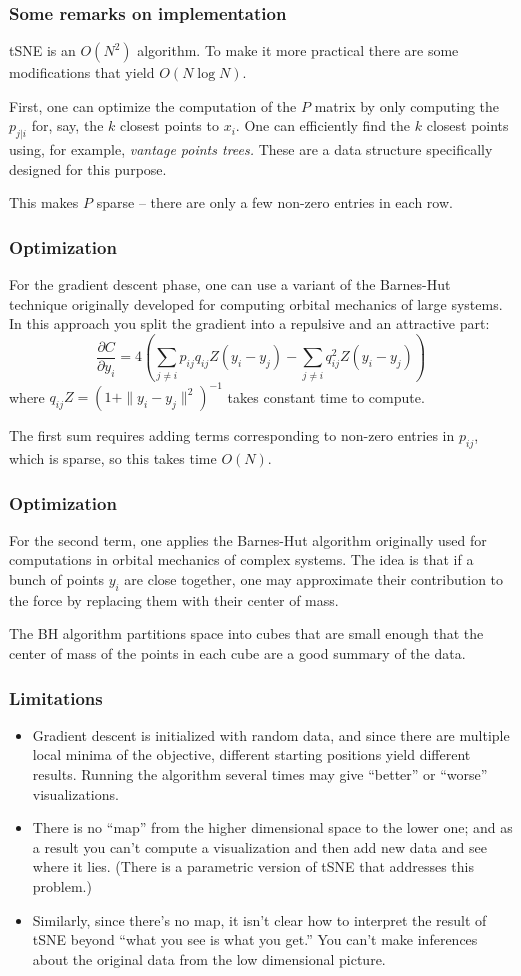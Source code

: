 \documentclass{beamer}
\begin{document}
\begin{frame}
  \frametitle{Some remarks on implementation}
  tSNE is an $O(N^2)$ algorithm.  To make it more practical there are some modifications that yield $O(N\log N)$.
  \bigskip\noindent

  First, one can optimize the computation of the $P$ matrix by only computing the $p_{j|i}$ for, say, the $k$ closest points to $x_i$.
  One can efficiently find the $k$ closest points using, for example, {\it vantage points trees.}  These are a data structure specifically
  designed for this purpose.
  \bigskip\noindent

  This makes $P$ sparse -- there are only a few non-zero entries in each row.
\end{frame}
\begin{frame}
  \frametitle{Optimization}
For the gradient descent phase, one can use a variant of the Barnes-Hut technique originally developed for computing orbital mechanics of large systems. In this approach you split the gradient into a repulsive and an attractive part:
  $$
  \frac{\partial C}{\partial y_i} = 4 (\sum_{j\not=i}p_{ij}q_{ij}Z(y_i-y_j)-\sum_{j\not=i}q_{ij}^2Z(y_i-y_j))
  $$
  where $q_{ij}Z=(1+\|y_i-y_j\|^2)^{-1}$ takes constant time to compute.
  \bigskip\noindent

  The first sum requires adding terms corresponding to non-zero entries in $p_{ij}$, which is sparse, so this takes time $O(N)$.
 \end{frame}
 \begin{frame}
   \frametitle{Optimization}
   For the second term, one applies the Barnes-Hut algorithm originally used for computations in orbital mechanics of complex systems.  The idea is
   that if a bunch of points $y_i$ are close together, one may approximate their contribution to the force by replacing them with their
   center of mass.
   \bigskip\noindent

   The BH algorithm partitions space into cubes that are small enough that the center of mass of the points in each cube are a good summary of the data.
 \end{frame}
 \begin{frame}
   \frametitle{Limitations}
   \begin{itemize}
   \item Gradient descent is initialized with random data, and since there are multiple local minima of the objective, different starting positions yield different results.  Running the algorithm several times may give ``better'' or ``worse'' visualizations.
   \item There is no ``map'' from the higher dimensional space to the lower one; and as a result you can't compute a visualization and then add new data and see where it lies.  (There is a parametric version of tSNE that addresses this problem.)
   \item Similarly, since there's no map, it isn't clear how to interpret the result of tSNE beyond ``what you see is what you get.''  You can't make inferences about the original data from the low dimensional picture.
   \end{itemize}
 \end{frame}
\end{document}
